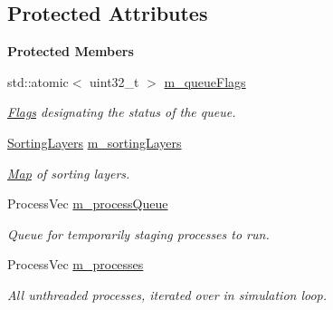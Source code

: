 \subsection*{Protected Attributes}
\begin{Indent}\textbf{ Protected Members}\par
\begin{DoxyCompactItemize}
\item 
\mbox{\label{classrev_1_1_process_queue_aceb860a95d54900e44eb19781cd44e43}} 
std\+::atomic$<$ uint32\+\_\+t $>$ \mbox{\hyperlink{classrev_1_1_process_queue_aceb860a95d54900e44eb19781cd44e43}{m\+\_\+queue\+Flags}}
\begin{DoxyCompactList}\small\item\em \mbox{\hyperlink{classrev_1_1_flags}{Flags}} designating the status of the queue. \end{DoxyCompactList}\item 
\mbox{\label{classrev_1_1_process_queue_aeeea5cf69a9b436c31fdcf7e19d2aac9}} 
\mbox{\hyperlink{structrev_1_1_sorting_layers}{Sorting\+Layers}} \mbox{\hyperlink{classrev_1_1_process_queue_aeeea5cf69a9b436c31fdcf7e19d2aac9}{m\+\_\+sorting\+Layers}}
\begin{DoxyCompactList}\small\item\em \mbox{\hyperlink{classrev_1_1_map}{Map}} of sorting layers. \end{DoxyCompactList}\item 
\mbox{\label{classrev_1_1_process_queue_a1fc9bc48321b06564c68f1c57af58eff}} 
Process\+Vec \mbox{\hyperlink{classrev_1_1_process_queue_a1fc9bc48321b06564c68f1c57af58eff}{m\+\_\+process\+Queue}}
\begin{DoxyCompactList}\small\item\em Queue for temporarily staging processes to run. \end{DoxyCompactList}\item 
\mbox{\label{classrev_1_1_process_queue_a34c29652ceff0fc3161f493dc8faf39c}} 
Process\+Vec \mbox{\hyperlink{classrev_1_1_process_queue_a34c29652ceff0fc3161f493dc8faf39c}{m\+\_\+processes}}
\begin{DoxyCompactList}\small\item\em All unthreaded processes, iterated over in simulation loop. \end{DoxyCompactList}\end{DoxyCompactItemize}
\end{Indent}


